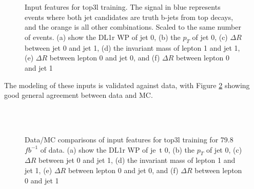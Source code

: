 \begin{figure}[H]
    \centering
    \\
    \\
    \caption{Input features for top3l training. The signal in blue represents events where both jet candidates are truth b-jets from top decays, and the orange is all other combinations. Scaled to the same number of events. (a) show the DL1r WP of jet 0, (b) the $p_T$ of jet 0, (c) $\Delta R$ between jet 0 and jet 1, (d) the invariant mass of lepton 1 and jet 1, (e) $\Delta R$ between lepton 0 and jet 0, and (f) $\Delta R$ between lepton 0 and jet 1}
    \label{fig:features_top3l}
\end{figure}

The modeling of these inputs is validated against data, with Figure \ref{fig:model_top3l} showing good general agreement between data and MC. 

\begin{figure}[H]                                                                                                         
    \centering
    \\
    \\
    \caption{Data/MC comparisons of input features for top3l training for 79.8 $fb^{-1}$ of data. (a) show the DL1r WP of je\
t 0, (b) the $p_T$ of jet 0, (c) $\Delta R$ between jet 0 and jet 1, (d) the invariant mass of lepton 1 and jet 1, (e) $\Delta R$ between lepton 0 and jet 0, and (f) $\Delta R$ between lepton 0 and jet 1}
    \label{fig:model_top3l}
\end{figure}

